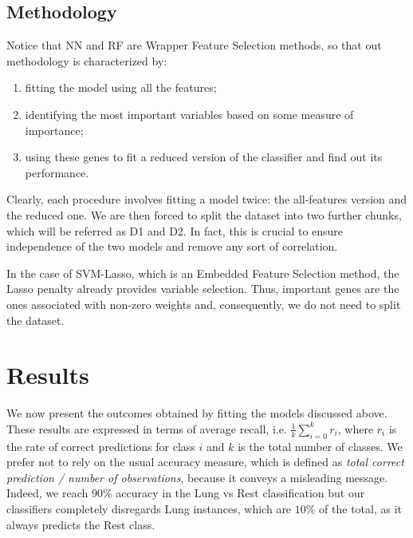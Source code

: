 \documentclass[a4paper,11pt, oneside]{article}  %
\begin{document}
\subsection{Methodology}
Notice that NN and RF are Wrapper Feature Selection methods, so that out methodology is characterized by:
\begin{enumerate}
	\item fitting the model using all the features;
	\item identifying the most important variables based on some measure of importance; 
	\item using these genes to fit a reduced version of the classifier and find out its performance.
\end{enumerate} 
Clearly, each procedure involves fitting a model twice: the all-features version and the reduced one.  We are then forced to split the dataset into two further chunks, which will be referred as D1 and D2. In fact, this is crucial to ensure independence of the two models and remove any sort of correlation.

In the case of SVM-Lasso, which is an Embedded Feature Selection method, the Lasso penalty already provides variable selection. Thus, important genes are the ones associated with non-zero weights and, consequently, we do not need to split the dataset. 

\section{Results}
We now present the outcomes obtained by fitting the models discussed above. \\
These results are expressed in terms of average recall, i.e. $\frac{1}{k} \sum\limits_{i = 0 }^k r_i$, where $r_i$ is the rate of correct predictions for class $i$ and $k$ is the total number of classes. We prefer not to rely on the usual accuracy measure,  which is defined as \textit{total correct prediction / number of observations}, because it conveys a misleading message.  Indeed,  we reach $90\%$ accuracy in the Lung vs Rest classification but our classifiers completely disregards Lung instances, which are $10\%$ of the total, as it always predicts the Rest class.  
\end{document}
